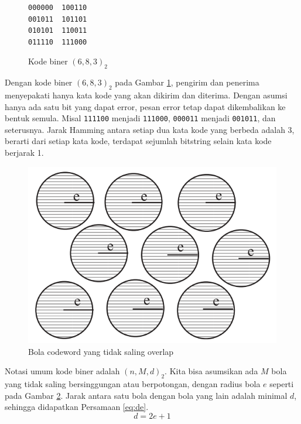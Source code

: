 \begin{figure}
\centering
\begin{BVerbatim}
000000  100110
001011  101101
010101  110011
011110  111000
\end{BVerbatim}
\caption{Kode biner $(6,8,3)_2$}
\label{fig:binarycode683}
\end{figure}

Dengan kode biner $(6,8,3)_2$ pada Gambar \ref{fig:binarycode683}, pengirim dan penerima menyepakati hanya kata kode yang akan dikirim dan diterima. Dengan asumsi hanya ada satu bit yang dapat error, pesan error tetap dapat dikembalikan ke bentuk semula. Misal \texttt{111100} menjadi \texttt{111000}, \texttt{000011} menjadi \texttt{001011}, dan seterusnya. Jarak Hamming antara setiap dua kata kode yang berbeda adalah 3, berarti dari setiap kata kode, terdapat sejumlah bitstring selain kata kode berjarak 1.

\begin{figure}
\centering
\includegraphics[scale=0.6]{../img/codewordsball.png}
\caption{Bola codeword yang tidak saling overlap}
\label{fig:codewordsball}
\end{figure}

Notasi umum kode biner adalah $(n,M,d)_2$. Kita bisa asumsikan ada $M$ bola yang tidak saling bersinggungan atau berpotongan, dengan radius bola $e$ seperti pada Gambar \ref{fig:codewordsball}. Jarak antara satu bola dengan bola yang lain adalah minimal $d$, sehingga didapatkan Persamaan \ref{eq:de}.
\begin{equation} \label{eq:de}
d = 2e + 1
\end{equation}

